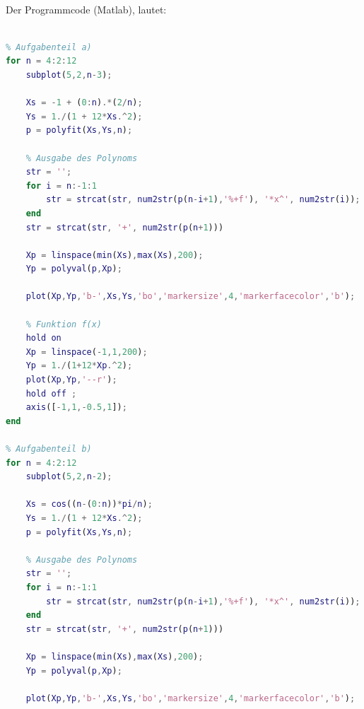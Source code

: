 \documentclass{mywork}
\begin{document}
\begin{aufgabe}~

	Der Programmcode (Matlab), lautet:
	\begin{lstlisting}[language=matlab]
% Stephan Hilb, 2706616

% Aufgabenteil a)
for n = 4:2:12
    subplot(5,2,n-3);
    
    Xs = -1 + (0:n).*(2/n);
    Ys = 1./(1 + 12*Xs.^2);
    p = polyfit(Xs,Ys,n);
    
    % Ausgabe des Polynoms
    str = '';
    for i = n:-1:1
        str = strcat(str, num2str(p(n-i+1),'%+f'), '*x^', num2str(i));
    end
    str = strcat(str, '+', num2str(p(n+1)))
    
    Xp = linspace(min(Xs),max(Xs),200);
    Yp = polyval(p,Xp);
    
    plot(Xp,Yp,'b-',Xs,Ys,'bo','markersize',4,'markerfacecolor','b');
    
    % Funktion f(x)
    hold on
    Xp = linspace(-1,1,200);
    Yp = 1./(1+12*Xp.^2);
    plot(Xp,Yp,'--r');
    hold off ;
    axis([-1,1,-0.5,1]);
end

% Aufgabenteil b)
for n = 4:2:12
    subplot(5,2,n-2);
    
    Xs = cos((n-(0:n))*pi/n);
    Ys = 1./(1 + 12*Xs.^2);
    p = polyfit(Xs,Ys,n);
    
    % Ausgabe des Polynoms
    str = '';
    for i = n:-1:1
        str = strcat(str, num2str(p(n-i+1),'%+f'), '*x^', num2str(i));
    end
    str = strcat(str, '+', num2str(p(n+1)))
    
    Xp = linspace(min(Xs),max(Xs),200);
    Yp = polyval(p,Xp);
    
    plot(Xp,Yp,'b-',Xs,Ys,'bo','markersize',4,'markerfacecolor','b'); 
    

\end{lstlisting}
\end{aufgabe}
\end{document}
